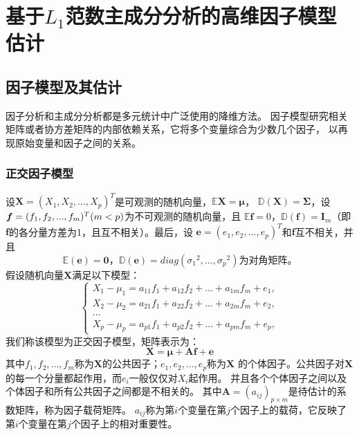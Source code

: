 \section{基于$L_1$范数主成分分析的高维因子模型估计}\label{chapter2}

\subsection{因子模型及其估计}
因子分析和主成分分析都是多元统计中广泛使用的降维方法。
因子模型研究相关矩阵或者协方差矩阵的内部依赖关系，它将多个变量综合为少数几个因子，
以再现原始变量和因子之间的关系。

\subsubsection{正交因子模型}

设$\bm{X} = (X_1, X_2, ..., X_p)^T$是可观测的随机向量，$\mathbb{E}\bm{X} = \bm{\mu}$，
$\mathbb{D}(\bm{X}) = \bm{\Sigma}$，设$\bm{f} = (f_1, f_2, ..., f_m)^T\\ (m <p)$为不可观测的随机向量，且
$\mathbb{E}\bm{f} = 0$，$\mathbb{D}(\bm{f}) = \bm{I}_m$（即$\bm{f}$的各分量方差为1，且互不相关）。最后，设
$\bm{e} = (e_1, e_2, ..., e_p)^T$和$\bm{f}$互不相关，并且
$$
    \mathbb{E}(\bm{e}) = \bm{0}\mbox{，}\mathbb{D}(\bm{e}) = diag({\sigma _1}^2, ..., {\sigma _p}^2)
    \mbox{为对角矩阵。}
$$
假设随机向量$\bm{X}$满足以下模型：
\begin{equation} \label{orth-factor}
\left\{
\begin{array}{clr}
    X_1 - \mu_1 = a_{11}f_1 + a_{12}f_2 + ... + a_{1m}f_m + e_1, \\
    X_2 - \mu_2 = a_{21}f_1 + a_{22}f_2 + ... + a_{2m}f_m + e_2, \\
    ... \\
    X_p - \mu_p = a_{p1}f_1 + a_{p2}f_2 + ... + a_{pm}f_m + e_p,
\end{array}
\right.
\end{equation}
我们称该模型为正交因子模型，矩阵表示为：
\begin{equation}
    \bm{X} = \bm{\mu} + \bm{A}\bm{f} + \bm{e}
\end{equation}
其中$f_1, f_2, ..., f_m$称为$\bm{X}$的公共因子；$e_1, e_2, ..., e_p$称为$\bm{X}$
的个体因子。公共因子对$\bm{X}$的每一个分量都起作用，而$e_i$一般仅仅对$X_i$起作用。
并且各个个体因子之间以及个体因子和所有公共因子之间都是不相关的。
其中$\bm{A} = (a_{ij})_{p \times m}$是待估计的系数矩阵，称为因子载荷矩阵。
$a_{ij}$称为第$i$个变量在第$j$个因子上的载荷，它反映了第$i$个变量在第$j$个因子上的相对重要性。

